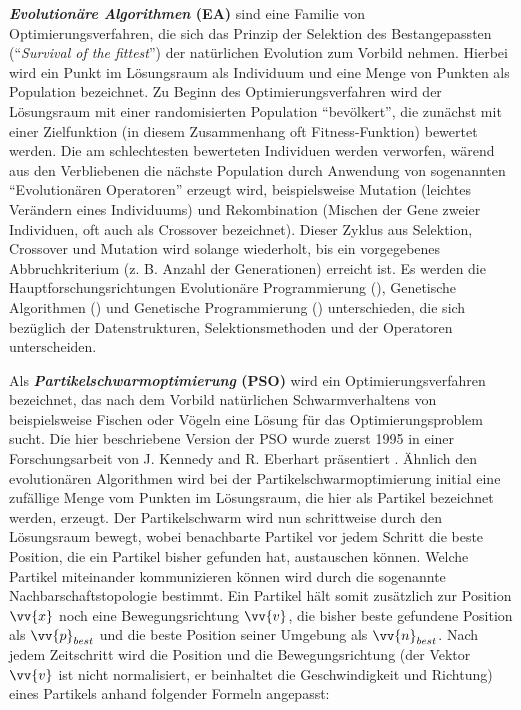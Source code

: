 \textbf{\textit{Evolution\"are Algorithmen} (EA)} sind eine Familie von Optimierungsverfahren, die sich das Prinzip der Selektion des Bestangepassten ("`\textit{Survival of the fittest}"') der nat\"urlichen Evolution zum Vorbild nehmen. Hierbei wird ein Punkt im L\"osungsraum als Individuum und eine Menge von Punkten als Population bezeichnet. Zu Beginn des Optimierungsverfahren wird der 
L\"osungsraum mit einer randomisierten Population "`bev\"olkert"', die zun\"achst mit einer Zielfunktion (in diesem Zusammenhang oft Fitness-Funktion) bewertet werden. Die am schlechtesten bewerteten Individuen werden verworfen, w\"arend aus den Verbliebenen die n\"achste Population durch Anwendung von sogenannten "`Evolutionären Operatoren"' erzeugt wird, beispielsweise Mutation
(leichtes Verändern eines Individuums) und Rekombination (Mischen der Gene zweier Individuen, oft auch als Crossover bezeichnet).
Dieser Zyklus aus Selektion, Crossover und Mutation wird solange wiederholt, bis ein vorgegebenes Abbruchkriterium (z. B. Anzahl der Generationen) erreicht ist.
Es werden die Hauptforschungsrichtungen Evolution\"are Programmierung (\cite{FogelAIsimEvo}), Genetische Algorithmen (\cite{GoldbergAISimEvo}) und Genetische Programmierung (\cite{KozaAIsimEvo}) unterschieden, die sich bez\"uglich der Datenstrukturen, Selektionsmethoden und der Operatoren unterscheiden.

Als \textbf{\textit{Partikelschwarmoptimierung} (PSO)} wird ein Optimierungsverfahren bezeichnet, das nach dem Vorbild nat\"urlichen Schwarmverhaltens von beispielsweise Fischen oder V\"ogeln eine L\"osung f\"ur das Optimierungsproblem sucht. Die hier beschriebene Version der PSO wurde zuerst 1995 in einer Forschungsarbeit von J. Kennedy and R. Eberhart präsentiert \cite{kennedyPSOConfPaper}. \"Ahnlich den evolution\"aren Algorithmen wird bei der Partikelschwarmoptimierung initial eine zuf\"allige  Menge vom Punkten im L\"osungsraum, die hier als Partikel bezeichnet werden, erzeugt. Der Partikelschwarm wird nun schrittweise durch den L\"osungsraum bewegt, wobei benachbarte Partikel vor jedem Schritt die beste Position, die ein Partikel bisher gefunden hat, austauschen k\"onnen. Welche Partikel miteinander kommunizieren k\"onnen wird durch die sogenannte Nachbarschaftstopologie bestimmt. 
Ein Partikel h\"alt somit zus\"atzlich zur Position $\vv{x}$ noch eine Bewegungsrichtung $\vv{v}$, die bisher beste gefundene Position als $\vv{p}_{best}$ und die beste Position seiner Umgebung als $\vv{n}_{best}$. Nach jedem Zeitschritt wird die Position und die Bewegungsrichtung (der Vektor $\vv{v}$ ist nicht normalisiert, er beinhaltet die Geschwindigkeit und Richtung) eines Partikels anhand folgender Formeln angepasst:

